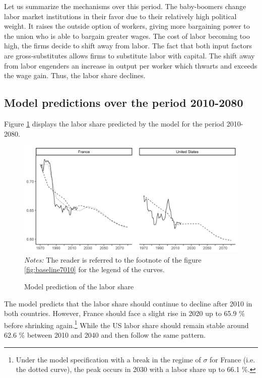 Let us summarize the mechanisms over this period. The baby-boomers change labor market institutions in their favor due to their relatively high political weight. It raises the outside option of workers, giving more bargaining power to the union who is able to bargain greater wages. The cost of labor becoming too high, the firms decide to shift away from labor. The fact that both input factors are gross-substitutes allows firms to substitute labor with capital. The shift away from labor engenders an increase in output per worker which thwarts and exceeds the wage gain. Thus, the labor share declines. %

\subsection{Model predictions over the period 2010-2080}

Figure \ref{fig:baseline1080} displays the labor share predicted by the model for the period 2010-2080.
\begin{figure}[tb]
	\centering
	\caption{Model prediction of the labor share} \label{fig:baseline1080}
	\includegraphics[width=1\linewidth]{../result/baseline7080.png}
	\vspace{-6ex}
	\justify\singlespacing\footnotesize \textit{Notes:} The reader is referred to the footnote of the figure \ref{fig:baseline7010} for the legend of the curves.
\end{figure}
The model predicts that the labor share should continue to decline after 2010 in both countries. However, France should face a slight rise in 2020 up to 65.9 \% before shrinking again.\footnote{Under the model specification with a break in the regime of $\sigma$ for France (i.e. the dotted curve), the peak occurs in 2030 with a labor share up to 66.1 \%.} While the US labor share should remain stable around 62.6 \% between 2010 and 2040 and then follow the same pattern.

